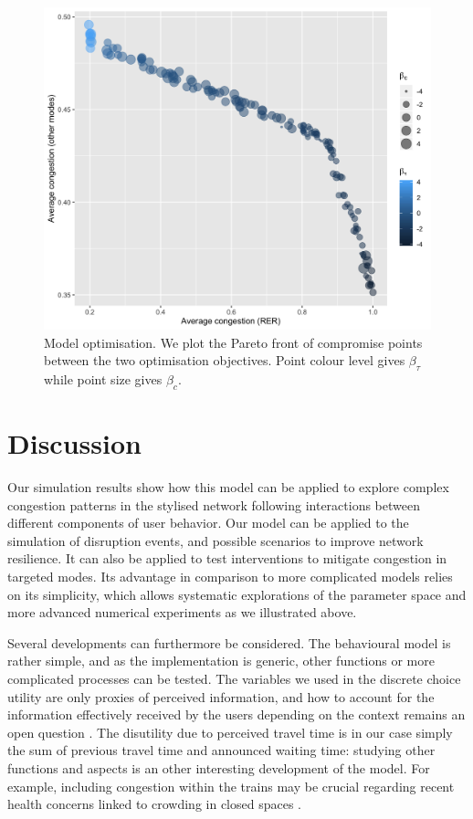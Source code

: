 \documentclass[10pt]{article}
\begin{document}
\begin{figure}%
\centerline{\includegraphics[width=0.75\linewidth]{Fig4.png}}
\caption{Model optimisation. We plot the Pareto front of compromise points between the two optimisation objectives. Point colour level gives $\beta_{\tau}$ while point size gives $\beta_c$.\label{fig:fig4}}
\end{figure}

\section{Discussion}


Our simulation results show how this model can be applied to explore complex congestion patterns in the stylised network following interactions between different components of user behavior. Our model can be applied to the simulation of disruption events, and possible scenarios to improve network resilience. It can also be applied to test interventions to mitigate congestion in targeted modes. Its advantage in comparison to more complicated models relies on its simplicity, which allows systematic explorations of the parameter space and more advanced numerical experiments as we illustrated above.

Several developments can furthermore be considered. The behavioural model is rather simple, and as the implementation is generic, other functions or more complicated processes can be tested. The variables we used in the discrete choice utility are only proxies of perceived information, and how to account for the information effectively received by the users depending on the context remains an open question \citep{gao2018trip}. The disutility due to perceived travel time is in our case simply the sum of previous travel time and announced waiting time: studying other functions and aspects is an other interesting development of the model. For example, including congestion within the trains may be crucial regarding recent health concerns linked to crowding in closed spaces \citep{raimbault2021estimating}.
\end{document}
